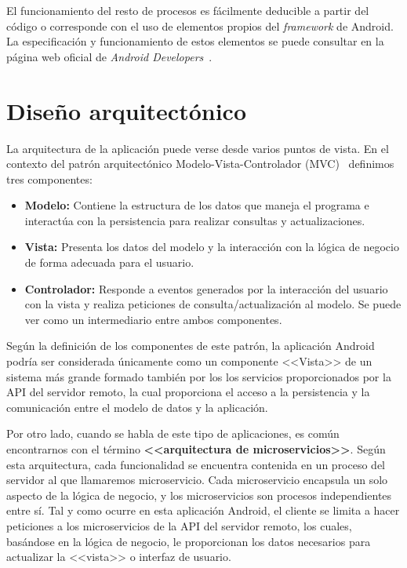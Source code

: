 El funcionamiento del resto de procesos es fácilmente deducible a partir del código o corresponde con el uso de elementos propios del \textit{framework} de Android. La especificación y funcionamiento de estos elementos se puede consultar en la página web oficial de \textit{Android Developers}~\cite{androiddevelopers}.  

\section{Diseño arquitectónico}

La arquitectura de la aplicación puede verse desde varios puntos de vista. En el contexto del patrón arquitectónico Modelo-Vista-Controlador (MVC)~\cite{wiki:mvc} definimos tres componentes: 
\begin{itemize}
	\item \textbf{Modelo:} Contiene la estructura de los datos que maneja el programa e interactúa con la persistencia para realizar consultas y actualizaciones. 
	\item \textbf{Vista:} Presenta los datos del modelo y la interacción con la lógica de negocio de forma adecuada para el usuario. 
	\item \textbf{Controlador:} Responde a eventos generados por la interacción del usuario con la vista y realiza peticiones de consulta/actualización al modelo. Se puede ver como un intermediario entre ambos componentes. 
\end{itemize}

Según la definición de los componentes de este patrón, la aplicación Android podría ser considerada únicamente como un componente <<Vista>> de un sistema más grande formado también por los los servicios proporcionados por la API del servidor remoto, la cual proporciona el acceso a la persistencia y la comunicación entre el modelo de datos y la aplicación. 

Por otro lado, cuando se habla de este tipo de aplicaciones, es común encontrarnos con el término \textbf{<<arquitectura de microservicios>>}. Según esta arquitectura, cada funcionalidad se encuentra contenida en un proceso del servidor al que llamaremos microservicio. Cada microservicio encapsula un solo aspecto de la lógica de negocio, y los microservicios son procesos independientes entre sí. Tal y como ocurre en esta aplicación Android, el cliente se limita a hacer peticiones a los microservicios de la API del servidor remoto, los cuales, basándose en la lógica de negocio, le proporcionan los datos necesarios para actualizar la <<vista>> o interfaz de usuario. 

